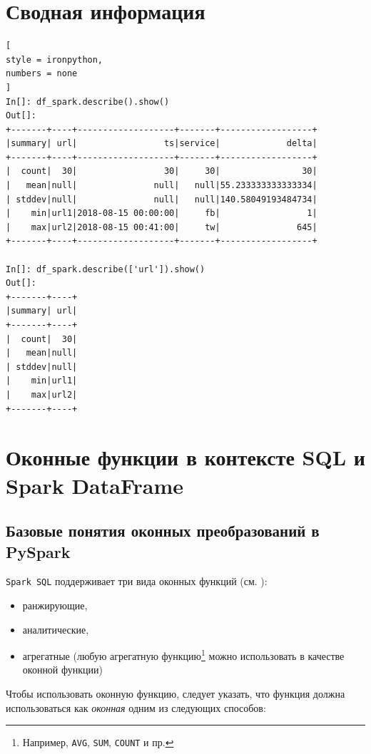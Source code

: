\documentclass[%
	11pt,
	a4paper,
	utf8,
		]{article}
\begin{document}
\section{Сводная информация}

\begin{lstlisting}[
style = ironpython,
numbers = none
]
In[]: df_spark.describe().show()
Out[]:
+-------+----+-------------------+-------+------------------+
|summary| url|                 ts|service|             delta|
+-------+----+-------------------+-------+------------------+
|  count|  30|                 30|     30|                30|
|   mean|null|               null|   null|55.233333333333334|
| stddev|null|               null|   null|140.58049193484734|
|    min|url1|2018-08-15 00:00:00|     fb|                 1|
|    max|url2|2018-08-15 00:41:00|     tw|               645|
+-------+----+-------------------+-------+------------------+

In[]: df_spark.describe(['url']).show()
Out[]:
+-------+----+
|summary| url|
+-------+----+
|  count|  30|
|   mean|null|
| stddev|null|
|    min|url1|
|    max|url2|
+-------+----+
\end{lstlisting}

\section{Оконные функции в контексте SQL и Spark DataFrame}

\subsection{Базовые понятия оконных преобразований в PySpark}

\texttt{Spark SQL} поддерживает три вида оконных функций (см. ):

\begin{itemize}
	\item ранжирующие,
	
	\item аналитические,
	
	\item агрегатные (любую агрегатную функцию\footnote{Например, \texttt{AVG}, \texttt{SUM}, \texttt{COUNT} и пр.} можно использовать в качестве оконной функции)
\end{itemize}

Чтобы использовать оконную функцию, следует указать, что функция должна использоваться как \emph{оконная} одним из следующих способов:
\end{document}
